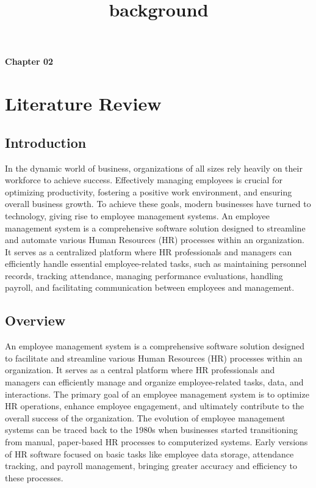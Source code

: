 \title{background}
\begin{center}
    \textbf{Chapter 02}\\
   \section{ \large \textbf{Literature Review}}
\end{center}
\subsection{Introduction}
In the dynamic world of business, organizations of all sizes rely heavily on their workforce to achieve success. Effectively managing employees is crucial for optimizing productivity, fostering a positive work environment, and ensuring overall business growth. To achieve these goals, modern businesses have turned to technology, giving rise to employee management systems. An employee management system is a comprehensive software solution designed to streamline and automate various Human Resources (HR) processes within an organization. It serves as a centralized platform where HR professionals and managers can efficiently handle essential employee-related tasks, such as maintaining personnel records, tracking attendance, managing performance evaluations, handling payroll, and facilitating communication between employees and management.
\subsection{Overview}
An employee management system is a comprehensive software solution designed to
facilitate and streamline various Human Resources (HR) processes within an organization.
It serves as a central platform where HR professionals and managers can efficiently manage
and organize employee-related tasks, data, and interactions. The primary goal of an
employee management system is to optimize HR operations, enhance employee engagement,
and ultimately contribute to the overall success of the organization. The evolution of
employee management systems can be traced back to the 1980s when businesses started
transitioning from manual, paper-based HR processes to computerized systems. Early
versions of HR software focused on basic tasks like employee data storage, attendance
tracking, and payroll management, bringing greater accuracy and efficiency to these
processes.
\newpage
